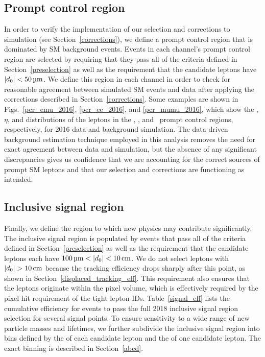 


\subsection{Prompt control region}
\label{pcr}
In order to verify the implementation of our selection and corrections to simulation (see Section~\ref{corrections}), we define a prompt control region that is dominated by SM background events. Events in each channel's prompt control region are selected by requiring that they pass all of the criteria defined in Section~\ref{preselection} as well as the requirement that the candidate leptons have $\ad<\SI{50}{\um}$. We define this region in each channel in order to check for reasonable agreement between simulated SM events and data after applying the corrections described in Section~\ref{corrections}. Some examples are shown in Figs.~\ref{pcr_emu_2016}, \ref{pcr_ee_2016}, and \ref{pcr_mumu_2016}, which show the \pt, $\eta$, and \ad distributions of the leptons in the \Pe\Pgm, \Pe\Pe, and \Pgm\Pgm\ prompt control regions, respectively, for 2016 data and background simulation. The data-driven background estimation technique employed in this analysis removes the need for exact agreement between data and simulation, but the absence of any significant discrepancies gives us confidence that we are accounting for the correct sources of prompt SM leptons and that our selection and corrections are functioning as intended.





\subsection{Inclusive signal region}
Finally, we define the region to which new physics may contribute significantly. The inclusive signal region is populated by events that pass all of the criteria defined in Section~\ref{preselection} as well as the requirement that the candidate leptons each have $\SI{100}{\um}<\ad<\SI{10}{\cm}$. We do not select leptons with $\ad>\SI{10}{\cm}$ because the tracking efficiency drops sharply after this point, as shown in Section~\ref{displaced_tracking_eff}. This requirement also ensures that the leptons originate within the pixel volume, which is effectively required by the pixel hit requirement of the tight lepton IDs. Table~\ref{signal_eff} lists the cumulative efficiency for \stoptolb events to pass the full 2018 inclusive signal region selection for several signal points. To ensure sensitivity to a wide range of new particle masses and lifetimes, we further subdivide the inclusive signal region into bins defined by the \ad of each candidate lepton and the \pt of one candidate lepton. The exact binning is described in Section~\ref{abcd}.



\pagebreak